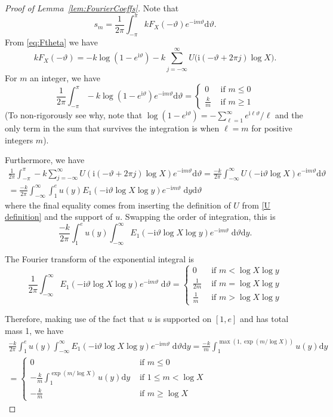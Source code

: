 \documentclass[10pt,a4paper]{amsart}
\newcommand{\dd}{\mathrm{d}}
\newcommand{\ii}{\mathrm{i}}
\begin{document}
\begin{proof}[Proof of Lemma~\ref{lem:FourierCoeffs}]
Note that
\[
s_m = \frac{1}{2\pi} \int_{-\pi}^\pi k F_X(-\vartheta) e^{-\ii m \vartheta} \dd \vartheta .
\]
From \eqref{eq:Ftheta} we have
\[
k F_X(-\vartheta) =  - k\log\left(1-e^{\ii \vartheta} \right) -k \sum_{j=-\infty}^\infty U\big(\ii(-\vartheta + 2\pi j)\log X\big) .
\]
For $m$ an integer, we have
\begin{equation}\label{eq:FourierCoeffLog}
\frac{1}{2\pi} \int_{-\pi}^\pi -k \log\left(1-e^{\ii \vartheta} \right) e^{-\ii m \vartheta} \dd\vartheta =
\begin{cases}
    0 & \text{ if } m \leq 0\\
    \frac{k}{m} & \text{ if } m \geq 1
\end{cases}
\end{equation}
(To non-rigorously see why, note that $\log\left(1-e^{\ii \vartheta} \right) = -\sum_{\ell=1}^\infty e^{\ii \ell \vartheta}/\ell$ and the only term in the sum that survives the integration is when $\ell=m$ for positive integers $m$).

Furthermore, we have
\begin{multline*}
\frac{1}{2\pi}  \int_{-\pi}^\pi -k \sum_{j=-\infty}^\infty U\left(\ii(-\vartheta+2\pi j) \log X \right) e^{-\ii m \vartheta} \dd\vartheta
= \frac{-k}{2\pi}
\int_{-\infty}^\infty U(-\ii \vartheta \log X) e^{-\ii m \vartheta} \dd\vartheta\\
= \frac{-k}{2\pi} \int_{-\infty}^\infty \int_1^e u(y) E_1(-\ii \vartheta \log X\log y) e^{-\ii m \vartheta} \;\dd y \dd\vartheta
\end{multline*}
where the final equality comes from inserting the definition of $U$ from \eqref{U definition} and the support of $u$. Swapping the order of integration, this is
\[
\frac{-k}{2\pi}  \int_1^e u(y) \int_{-\infty}^\infty E_1(-\ii \vartheta \log X\log y) e^{-\ii m \vartheta} \; \dd\vartheta \dd y .
\]

The Fourier transform of the exponential integral is
\[
\frac{1}{2\pi} \int_{-\infty}^\infty E_1(-\ii \vartheta \log X\log y) e^{-\ii m \vartheta} \; \dd\vartheta  =
\begin{cases}
    0 & \text{ if } m<\log X \log y\\
    \frac{1}{2m} & \text{ if } m = \log X \log y\\
    \frac{1}{m} & \text{ if } m > \log X \log y
\end{cases}
\]

Therefore, making use of the fact that $u$ is supported on $[1,e]$ and has total mass 1, we have
\begin{multline*}
\frac{-k}{2\pi}  \int_1^e u(y) \int_{-\infty}^\infty E_1(-\ii \vartheta \log X\log y) e^{-\ii m \vartheta} \; \dd\vartheta \dd y = \frac{-k}{m} \int_1^{\max(1,\exp(m/\log X))} u(y) \dd y \\
=\begin{cases}
    0 & \text{ if } m \leq 0 \\
    -\frac{k}{m} \int_1^{\exp(m/\log X)} u(y) \dd y & \text{ if } 1 \leq m < \log X \\
    -\frac{k}{m}  & \text{ if } m \geq \log X
\end{cases}
\end{multline*}


\end{proof}
\end{document}
